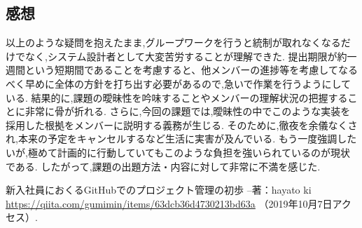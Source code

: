 \documentclass[uplatex,12pt]{jsarticle}
\begin{document}
\subsection{感想}
以上のような疑問を抱えたまま,グループワークを行うと統制が取れなくなるだけでなく,システム設計者として大変苦労することが理解できた.
提出期限が約一週間という短期間であることを考慮すると、他メンバーの進捗等を考慮してなるべく早めに全体の方針を打ち出す必要があるので,急いで作業を行うようにしている.
結果的に,課題の曖昧性を吟味することやメンバーの理解状況の把握することに非常に骨が折れる.
さらに,今回の課題では,曖昧性の中でこのような実装を採用した根拠をメンバーに説明する義務が生じる.
そのために,徹夜を余儀なくされ,本来の予定をキャンセルするなど生活に実害が及んでいる.
もう一度強調したいが,極めて計画的に行動していてもこのような負担を強いられているのが現状である.
したがって,課題の出題方法・内容に対して非常に不満を感じた.



\begin{thebibliography}{99}
 新入社員におくるGitHubでのプロジェクト管理の初歩 --著：hayato ki \\
\url{https://qiita.com/gumimin/items/63dcb36d4730213bd63a} （2019年10月7日アクセス）.

\end{thebibliography}
\end{document}
